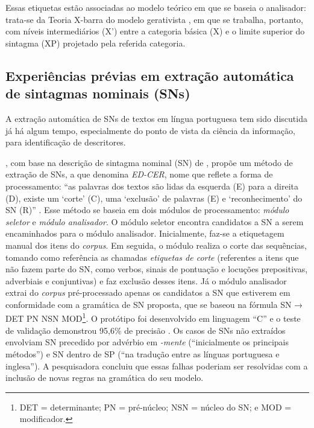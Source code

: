 \documentclass[portuguese]{textolivre}
\begin{document}
Essas etiquetas estão associadas ao modelo teórico em que se baseia o analisador: trata-se da Teoria X-barra do modelo gerativista \cite{chomsky_remarks_1970,jackendoff_x_1977}, em que se trabalha, portanto, com níveis intermediários (X’) entre a categoria básica (X) e o limite superior do sintagma (XP) projetado pela referida categoria.

\subsection{Experiências prévias em extração automática de sintagmas nominais (SNs)}

A extração automática de SNs de textos em língua portuguesa tem sido discutida já há algum tempo, especialmente do ponto de vista da ciência da informação, para identificação de descritores.

\textcite{miorelli_ed-cer:_2001}, com base na descrição de sintagma nominal (SN) de \textcite{perini_gramatica_1995}, propõe um método de extração de SNs, a que denomina \textit{ED-CER}, nome que reflete a forma de processamento: “as palavras dos textos são lidas da esquerda (E) para a direita (D), existe um ‘corte’ (C), uma ‘exclusão’ de palavras (E) e ‘reconhecimento’ do SN (R)” \cite[p.~47]{miorelli_ed-cer:_2001}. Esse método se baseia em dois módulos de processamento: \textit{módulo seletor} e \textit{módulo analisador}. O módulo seletor encontra candidatos a SN a serem encaminhados para o módulo analisador. Inicialmente, faz-se a etiquetagem manual dos itens do \textit{corpus}. Em seguida, o módulo realiza o corte das sequências, tomando como referência as chamadas \textit{etiquetas de corte} (referentes a itens que não fazem parte do SN, como verbos, sinais de pontuação e locuções prepositivas, adverbiais e conjuntivas) e faz exclusão desses itens. Já o módulo analisador extrai do \textit{corpus} pré-processado apenas os candidatos a SN que estiverem em conformidade com a gramática de SN proposta, que se baseou na fórmula SN → DET PN NSN MOD\footnote{DET = determinante; PN = pré-núcleo; NSN = núcleo do SN; e MOD = modificador.}. O protótipo foi desenvolvido em linguagem “C” e o teste de validação demonstrou 95,6\% de precisão \cite[p.~66]{miorelli_ed-cer:_2001}. Os casos de SNs não extraídos envolviam SN precedido por advérbio em \textit{-mente} (“inicialmente os principais métodos”) e SN dentro de SP (“na tradução entre as línguas portuguesa e inglesa”). A pesquisadora concluiu que essas falhas poderiam ser resolvidas com a inclusão de novas regras na gramática do seu modelo.
\end{document}
